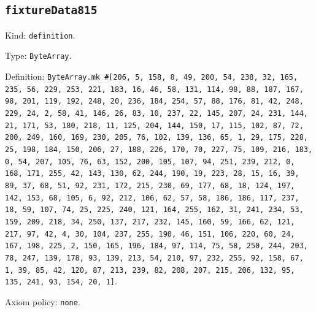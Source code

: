 \documentclass[11pt]{article}
\begin{document}
\subsection*{\texttt{fixtureData815}}
\noindent Kind: \texttt{definition}.\par
\noindent Type: \texttt{ByteArray}.\par
\noindent Definition: \texttt{ByteArray.mk \#[206, 5, 158, 8, 49, 200, 54, 238, 32, 165, 235, 56, 229, 253, 221, 183, 16, 46, 58, 131, 114, 98, 88, 187, 167, 98, 201, 119, 192, 248, 20, 236, 184, 254, 57, 88, 176, 81, 42, 248, 229, 24, 2, 58, 41, 146, 26, 83, 10, 237, 22, 145, 207, 24, 231, 144, 21, 171, 53, 180, 218, 11, 125, 204, 144, 150, 17, 115, 102, 87, 72, 200, 249, 160, 169, 230, 205, 76, 102, 139, 136, 65, 1, 29, 175, 228, 25, 198, 184, 150, 206, 27, 188, 226, 170, 70, 227, 75, 109, 216, 183, 0, 54, 207, 105, 76, 63, 152, 200, 105, 107, 94, 251, 239, 212, 0, 168, 171, 255, 42, 143, 130, 62, 244, 190, 19, 223, 28, 15, 16, 39, 89, 37, 68, 51, 92, 231, 172, 215, 230, 69, 177, 68, 18, 124, 197, 142, 153, 68, 105, 6, 92, 212, 106, 62, 57, 58, 186, 186, 117, 237, 18, 59, 107, 74, 25, 225, 240, 121, 164, 255, 162, 31, 241, 234, 53, 159, 209, 218, 34, 250, 137, 217, 232, 145, 160, 59, 166, 62, 121, 217, 97, 42, 4, 30, 104, 237, 255, 190, 46, 151, 106, 220, 60, 24, 167, 198, 225, 2, 150, 165, 196, 184, 97, 114, 75, 58, 250, 244, 203, 78, 247, 139, 178, 93, 139, 213, 54, 210, 97, 232, 255, 92, 158, 67, 1, 39, 85, 42, 120, 87, 213, 239, 82, 208, 207, 215, 206, 132, 95, 135, 241, 93, 154, 20, 1]}.\par
\noindent Axiom policy: \texttt{none}.\par
\end{document}
